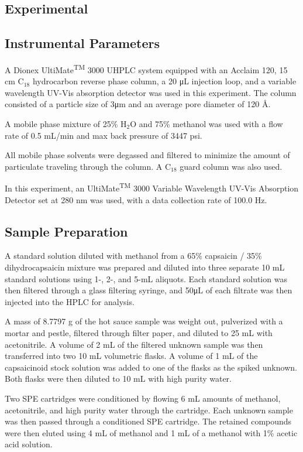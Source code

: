 \documentclass{article}
\begin{document}
\begin{multicols}{2}
{\section*{Experimental}
\subsection*{Instrumental Parameters}

A Dionex UltiMate\textsuperscript{TM} 3000 UHPLC system equipped with an
    Acclaim\textsuperscript{\textregistered} 120, 15 cm C$_{18}$ hydrocarbon reverse
    phase column, a 20 μL injection loop, and a variable wavelength UV-Vis
    absorption detector was used in this experiment.
    The column consisted of a particle size of 3μm and an average pore diameter of
    120 \AA. \cite{dionex}

    A mobile phase mixture of 25\% H$_2$O and 75\% methanol was used with a flow
    rate of 0.5 mL/min and max back pressure of 3447 psi.

    All mobile phase solvents were degassed and filtered to minimize the amount of
    particulate traveling through the column. 
    A C$_{18}$ guard column was also used.

    In this experiment, an UltiMate\textsuperscript{TM} 3000 Variable Wavelength UV-Vis
    Absorption Detector set at 280 nm was used, with a data collection rate of 100.0
    Hz.

\subsection*{Sample Preparation}
A standard solution diluted with methanol from a 65\% capsaicin / 35\%
    dihydrocapsaicin mixture was prepared and diluted into three separate 10 mL
    standard solutions using 1-, 2-, and 5-mL aliquots. Each standard solution was
    then filtered through a glass filtering syringe, and 50μL of each filtrate was
    then injected into the HPLC for analysis.

    A mass of 8.7797 g of the hot sauce sample was weight out, pulverized with a
    mortar and pestle, filtered through filter paper, and diluted to 25 mL with acetonitrile.
    A volume of 2 mL of the filtered unknown sample was then transferred into two 10
    mL volumetric flasks. A volume of 1 mL of the capsaicinoid stock solution was
    added to one of the flasks as the spiked unknown. Both flasks were then diluted
    to 10 mL with high purity water.

    Two SPE cartridges were conditioned by flowing 6 mL amounts of methanol,
    acetonitrile, and high purity water through the cartridge. Each unknown sample
    was then passed through a conditioned SPE cartridge. The retained compounds
    were then eluted using 4 mL of methanol and 1 mL of a methanol with 1\% acetic
    acid solution.

}
\end{multicols}
\end{document}
